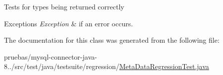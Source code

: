 Tests for types being returned correctly


\begin{DoxyExceptions}{Exceptions}
{\em Exception} & if an error occurs. \\
\hline
\end{DoxyExceptions}


The documentation for this class was generated from the following file\+:\begin{DoxyCompactItemize}
\item 
pruebas/mysql-\/connector-\/java-\/8../src/test/java/testsuite/regression/\mbox{\hyperlink{_meta_data_regression_test_8java}{Meta\+Data\+Regression\+Test.\+java}}\end{DoxyCompactItemize}
